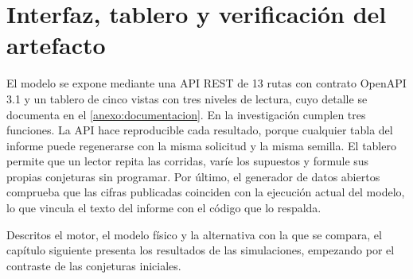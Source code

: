 \section{Interfaz, tablero y verificaci\'on del artefacto}
El modelo se expone mediante una API REST de 13 rutas con contrato OpenAPI 3.1 y un tablero de cinco vistas con tres niveles de lectura, cuyo detalle se documenta en el \cref{anexo:documentacion}. En la investigaci\'on cumplen tres funciones. La API hace reproducible cada resultado, porque cualquier tabla del informe puede regenerarse con la misma solicitud y la misma semilla. El tablero permite que un lector repita las corridas, var\'ie los supuestos y formule sus propias conjeturas sin programar. Por \'ultimo, el generador de datos abiertos comprueba que las cifras publicadas coinciden con la ejecuci\'on actual del modelo, lo que vincula el texto del informe con el c\'odigo que lo respalda.

Descritos el motor, el modelo f\'isico y la alternativa con la que se compara, el cap\'itulo siguiente presenta los resultados de las simulaciones, empezando por el contraste de las conjeturas iniciales.
